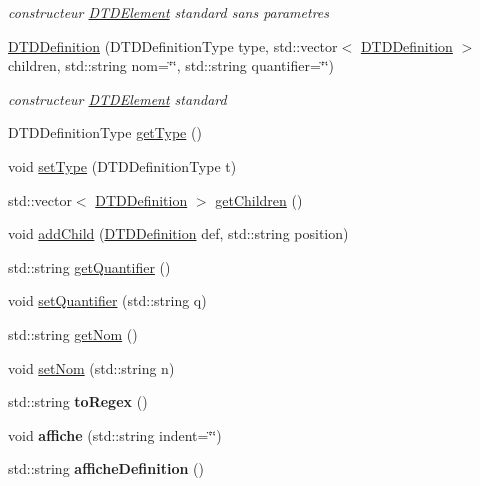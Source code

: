 \begin{DoxyCompactItemize}
\begin{DoxyCompactList}\small\item\em constructeur \hyperlink{class_d_t_d_element}{\-D\-T\-D\-Element} standard sans parametres \end{DoxyCompactList}\item 
\hyperlink{class_d_t_d_definition_aa961e4ed01574c6de5e6e73ffb4c9592}{\-D\-T\-D\-Definition} (\-D\-T\-D\-Definition\-Type type, std\-::vector$<$ \hyperlink{class_d_t_d_definition}{\-D\-T\-D\-Definition} $>$ children, std\-::string nom=\char`\"{}\char`\"{}, std\-::string quantifier=\char`\"{}\char`\"{})
\begin{DoxyCompactList}\small\item\em constructeur \hyperlink{class_d_t_d_element}{\-D\-T\-D\-Element} standard \end{DoxyCompactList}\item 
\-D\-T\-D\-Definition\-Type \hyperlink{class_d_t_d_definition_a9cde9c722b5b2a52a0e4c11aa69e499c}{get\-Type} ()
\item 
void \hyperlink{class_d_t_d_definition_a82ecfbe7e6b041a7c60ea2a08afd502f}{set\-Type} (\-D\-T\-D\-Definition\-Type t)
\item 
std\-::vector$<$ \hyperlink{class_d_t_d_definition}{\-D\-T\-D\-Definition} $>$ \hyperlink{class_d_t_d_definition_ab5d59213f00ed5b638609ff0ed05105d}{get\-Children} ()
\item 
void \hyperlink{class_d_t_d_definition_a503fb32f4dca9734f3461c8b4e51d47a}{add\-Child} (\hyperlink{class_d_t_d_definition}{\-D\-T\-D\-Definition} def, std\-::string position)
\item 
std\-::string \hyperlink{class_d_t_d_definition_a4dedfabb1677ae2d868cf442f9d71a3f}{get\-Quantifier} ()
\item 
void \hyperlink{class_d_t_d_definition_adcaf15a63f7aea5f830afdfc547d7f0f}{set\-Quantifier} (std\-::string q)
\item 
std\-::string \hyperlink{class_d_t_d_definition_ae841f380428801005b8bcfc11577a5eb}{get\-Nom} ()
\item 
void \hyperlink{class_d_t_d_definition_adba8f775dbfe57dbd3518e4121b05747}{set\-Nom} (std\-::string n)
\item 
\hypertarget{class_d_t_d_definition_ac01b9bac794d607c165352c41ad5885a}{std\-::string {\bfseries to\-Regex} ()}\label{class_d_t_d_definition_ac01b9bac794d607c165352c41ad5885a}

\item 
\hypertarget{class_d_t_d_definition_a50dd51e05b66ae0ce0850565f422e8f6}{void {\bfseries affiche} (std\-::string indent=\char`\"{}\char`\"{})}\label{class_d_t_d_definition_a50dd51e05b66ae0ce0850565f422e8f6}

\item 
\hypertarget{class_d_t_d_definition_a7c58e90b5a56502a26da49b9dca3898a}{std\-::string {\bfseries affiche\-Definition} ()}\label{class_d_t_d_definition_a7c58e90b5a56502a26da49b9dca3898a}

\end{DoxyCompactItemize}

